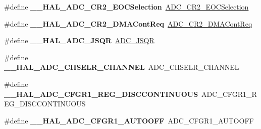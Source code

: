 \begin{DoxyCompactItemize}
\item 
\mbox{\label{group___h_a_l___a_d_c___aliased___macros_gafb4baec5d5d5ebf891a3cd8a9a0bfe65}} 
\#define {\bfseries \+\_\+\+\_\+\+H\+A\+L\+\_\+\+A\+D\+C\+\_\+\+C\+R2\+\_\+\+E\+O\+C\+Selection}~\mbox{\hyperlink{group___a_d_c___private___macros_gaa6514c197b4d16b3d08938cdad573ef5}{A\+D\+C\+\_\+\+C\+R2\+\_\+\+E\+O\+C\+Selection}}
\item 
\mbox{\label{group___h_a_l___a_d_c___aliased___macros_gaedcab24fbd762b1f6b65c7381f910308}} 
\#define {\bfseries \+\_\+\+\_\+\+H\+A\+L\+\_\+\+A\+D\+C\+\_\+\+C\+R2\+\_\+\+D\+M\+A\+Cont\+Req}~\mbox{\hyperlink{group___a_d_c___private___macros_ga93bf2d0e4b9f98b83ee48be918e9c940}{A\+D\+C\+\_\+\+C\+R2\+\_\+\+D\+M\+A\+Cont\+Req}}
\item 
\mbox{\label{group___h_a_l___a_d_c___aliased___macros_ga920c922d2385fcaab11b2ca7c8630da8}} 
\#define {\bfseries \+\_\+\+\_\+\+H\+A\+L\+\_\+\+A\+D\+C\+\_\+\+J\+S\+QR}~\mbox{\hyperlink{group___a_d_c_ex___private___macros_gaa40c3e803cf20a8aebc3735a714606ad}{A\+D\+C\+\_\+\+J\+S\+QR}}
\item 
\mbox{\label{group___h_a_l___a_d_c___aliased___macros_gae5547f083abe059cacdcaac3e5066ea2}} 
\#define {\bfseries \+\_\+\+\_\+\+H\+A\+L\+\_\+\+A\+D\+C\+\_\+\+C\+H\+S\+E\+L\+R\+\_\+\+C\+H\+A\+N\+N\+EL}~A\+D\+C\+\_\+\+C\+H\+S\+E\+L\+R\+\_\+\+C\+H\+A\+N\+N\+EL
\item 
\mbox{\label{group___h_a_l___a_d_c___aliased___macros_ga3703e313dbcb2af3dea5a07d622e67c6}} 
\#define {\bfseries \+\_\+\+\_\+\+H\+A\+L\+\_\+\+A\+D\+C\+\_\+\+C\+F\+G\+R1\+\_\+\+R\+E\+G\+\_\+\+D\+I\+S\+C\+C\+O\+N\+T\+I\+N\+U\+O\+US}~A\+D\+C\+\_\+\+C\+F\+G\+R1\+\_\+\+R\+E\+G\+\_\+\+D\+I\+S\+C\+C\+O\+N\+T\+I\+N\+U\+O\+US
\item 
\mbox{\label{group___h_a_l___a_d_c___aliased___macros_gab767937348c3e3b3c22e7316e42004c1}} 
\#define {\bfseries \+\_\+\+\_\+\+H\+A\+L\+\_\+\+A\+D\+C\+\_\+\+C\+F\+G\+R1\+\_\+\+A\+U\+T\+O\+O\+FF}~A\+D\+C\+\_\+\+C\+F\+G\+R1\+\_\+\+A\+U\+T\+O\+O\+FF
\item 

\end{DoxyCompactItemize}
